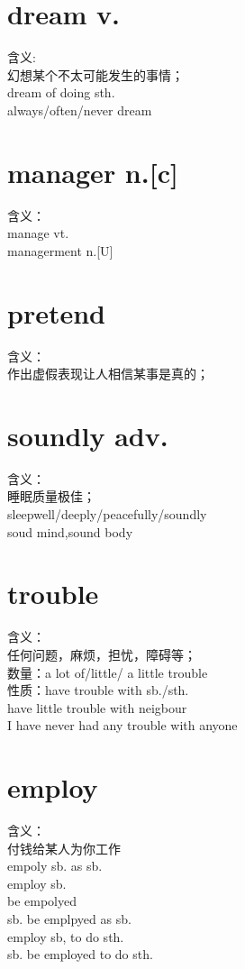 \documentclass[twocolumn]{ctexbook}
\newcommand{\phrase}[1]{{\colorbox{yellow!40}{#1}}}
\newcommand{\point}[1]{{\color{red}#1}}
\newcommand{\sentence}[1]{{\colorbox[gray]{0.8}{#1}}}
\begin{document}
        \section{dream v.}
        含义:\\
        幻想某个不太可能发生的事情；\\
        dream of doing sth.\\
        always/often/never dream\\
        \section{manager n.[c]}
        含义：\\
        manage vt.\\
        managerment  n.[U]
        \section{pretend}
        含义：\\
        作出\point{虚假表现}让人相信某事是真的；\\
        \section{soundly adv.}
        含义：\\
        睡眠质量极佳；\\
        sleep\phrase{well/deeply/peacefully/soundly}\\
        \sentence{soud mind,sound body}\\
        \section{trouble}
        含义：\\
        任何问题，麻烦，担忧，障碍等；\\
        数量：a lot of/little/ a little trouble\\
        性质：have trouble with sb./sth.\\
        have little trouble with neigbour\\
        I have never had any trouble with anyone\\

        \section{employ}
        含义：\\
        付钱给某人为你工作\\
        empoly sb. as sb.\\
        employ sb. \\
        be empolyed \\
        sb. be emplpyed as sb.\\
        employ sb, to do sth.\\
        sb.  be employed to do sth.\\
\end{document}
